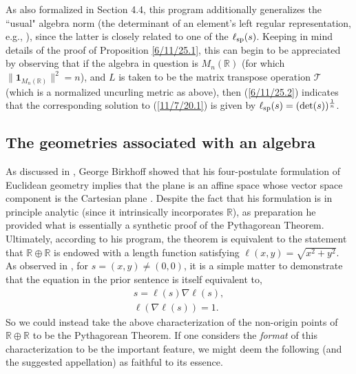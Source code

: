\documentclass{amsart}
\theoremstyle{definition}
\numberwithin{theorem}{section}
\numberwithin{equation}{section}
\begin{document}
As also formalized in Section 4.4, this program additionally generalizes the ``usual" algebra norm (the determinant of an element's left regular representation, e.g., \cite{bourbaki:1989}), since the latter is closely related to one of the $\ell_{\rm sp}(s)$. Keeping in mind details of the proof of Proposition \ref{6/11/25.1},  this can begin to be appreciated by observing that if the algebra in question is $M_n(\mathbb{R})$ (for which $\|\mathbf{1}_{M_n(\mathbb{R})}\|^2=n$), and $L$ is taken to be the matrix transpose operation $\mathcal{T}$ (which is a normalized uncurling metric as above), then (\ref{6/11/25.2}) indicates that the corresponding solution to (\ref{11/7/20.1}) is given by $\ell_{\rm sp}(s) = (\text{det}(s))^\frac{1}{n}$. 

\subsection{The geometries associated with an algebra}

As discussed in \cite{fgreensite:2025b}, George Birkhoff showed that his four-postulate formulation of Euclidean geometry implies that the plane is an affine space whose vector space component is the Cartesian plane \cite{birkhoff:1932}.  Despite the fact that his formulation is in principle analytic (since it intrinsically incorporates $\mathbb{R}$), as preparation he provided what is essentially a synthetic proof of the Pythagorean Theorem.  Ultimately, according to his program, the theorem is equivalent to the statement that $\mathbb{R}\oplus\mathbb{R}$ is endowed with a length function satisfying $\ell(x,y)=\sqrt{x^2+y^2}$.  As observed in \cite{fgreensite:2025b}, for $s=(x,y)\ne (0,0)$, it is a simple matter to demonstrate that the equation in the prior sentence is itself equivalent to, \begin{eqnarray*} s = \ell(s) \nabla \ell(s),\\  \ell(\nabla \ell(s)) = 1. \end{eqnarray*}  So we could instead take the above characterization of the non-origin points of $\mathbb{R}\oplus\mathbb{R}$ to be the Pythagorean Theorem.  If one considers the {\it format} of this characterization to be the important feature, we might deem the following (and the suggested appellation) as faithful to its essence.
\end{document}
